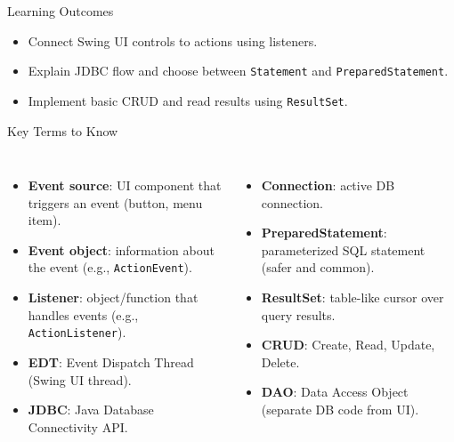 \documentclass{beamer}
\begin{document}
\begin{frame}{Learning Outcomes}
  \begin{itemize}[<+->]
    \item Connect Swing UI controls to actions using listeners.
    \item Explain JDBC flow and choose between \texttt{Statement} and \texttt{PreparedStatement}.
    \item Implement basic CRUD and read results using \texttt{ResultSet}.
  \end{itemize}
  \slidesources{\OOPSUnitIVSources}
\end{frame}

\begin{frame}{Key Terms to Know}
\small
\begin{columns}[t]
\begin{itemize}
  \item \textbf{Event source}: UI component that triggers an event (button, menu item).
  \item \textbf{Event object}: information about the event (e.g., \texttt{ActionEvent}).
  \item \textbf{Listener}: object/function that handles events (e.g., \texttt{ActionListener}).
  \item \textbf{EDT}: Event Dispatch Thread (Swing UI thread).
  \item \textbf{JDBC}: Java Database Connectivity API.
\end{itemize}
\begin{itemize}
  \item \textbf{Connection}: active DB connection.
  \item \textbf{PreparedStatement}: parameterized SQL statement (safer and common).
  \item \textbf{ResultSet}: table-like cursor over query results.
  \item \textbf{CRUD}: Create, Read, Update, Delete.
  \item \textbf{DAO}: Data Access Object (separate DB code from UI).
\end{itemize}
\end{columns}
  \slidesources{\OOPSUnitIVSources}
\end{frame}
\end{document}
